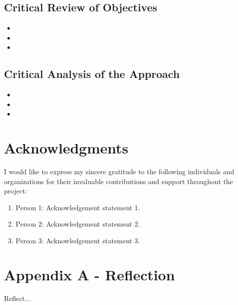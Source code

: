 \documentclass{UoNMCHA}
\numberwithin{equation}{section}
\begin{document}
\subsection{Critical Review of Objectives}\label{sub:Critical Review of Objectives}
\begin{itemize}
	\item 
	\item 
	\item 
\end{itemize}

\subsection{Critical Analysis of the Approach}\label{sub:Critical Analysis of the Approach}
\begin{itemize}
	\item 
	\item 
	\item 
\end{itemize}
\newpage
\cite{website1}
\cite{website2}
\cite{website3}
\cite{website4}
\cite{website5}
\cite{website6}
\cite{website7}
\cite{website8}
\cite{website9}
\cite{website10}
\newpage
\section{Acknowledgments}\label{sec:Acknowledgments}
I would like to express my sincere gratitude to the following individuals and organizations for their invaluable contributions and support throughout the project:\\

\begin{enumerate}
	\item Person 1: Acknowledgement statement 1.
	\item Person 2: Acknowledgement statement 2.
	\item Person 3: Acknowledgement statement 3.
\end{enumerate}

\appendix
\newpage

\section{Appendix A - Reflection}\label{app:Reflection}
Reflect...\\
\end{document}
